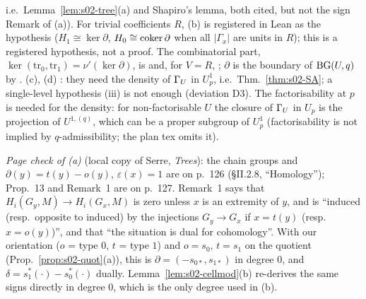 i.e.\ Lemma~\ref{lem:s02-tree}(a) and Shapiro's lemma, both cited, but not the sign Remark of (a)). For trivial coefficients $R$,
(b) is registered in Lean as the hypothesis  ($H_1\cong\ker\partial$, $H_0\cong\operatorname{coker}\partial$ when all
$|\Gamma_x|$ are units in $R$); this is a registered hypothesis, not a proof.
The combinatorial part, $\ker(\mathrm{tr}_0,\mathrm{tr}_1)=\nu'(\ker\partial)$, is \stproved{} and, for $V=R$, \stformal{}
; $\partial$ is the boundary of $\mathrm{BG}(U,q)$ by
. (c), (d) \stpmc{}: they need the density of $\Gamma_U$ in
$U^1_p$, i.e.\ Thm.~\ref{thm:s02-SA}; a single-level hypothesis (iii) is not enough (deviation D3). The factorisability at $p$ is needed
for the density: for non-factorisable $U$ the closure of $\Gamma_U$ in $U_p$ is the projection of $U^{1,(q)}$, which can be a proper subgroup of $U^1_p$
(factorisability is not implied by $q$-admissibility; the plan tex omits it).

\emph{Page check of (a)} (local copy of Serre, \emph{Trees}): the chain groups and $\partial(y)=t(y)-o(y)$, $\varepsilon(x)=1$ are on p.~126 (\S II.2.8,
``Homology''); Prop.~13 and Remark~1 are on p.~127. Remark~1 says that $H_i(G_y,M)\to H_i(G_x,M)$ is zero unless $x$ is an extremity of $y$, and is
``induced (resp.\ opposite to induced) by the injections $G_y\to G_x$ if $x=t(y)$ (resp.\ $x=o(y)$)'', and that ``the situation is dual for
cohomology''. With our orientation ($o$ = type $0$, $t$ = type $1$) and $o=s_0$, $t=s_1$ on the quotient (Prop.~\ref{prop:s02-quot}(a)), this is
$\partial=(-s_{0*},s_{1*})$ in degree $0$, and $\delta=s_1^*(\cdot)-s_0^*(\cdot)$ dually. Lemma~\ref{lem:s02-cellmod}(b) re-derives the same signs directly
in degree $0$, which is the only degree used in (b).

